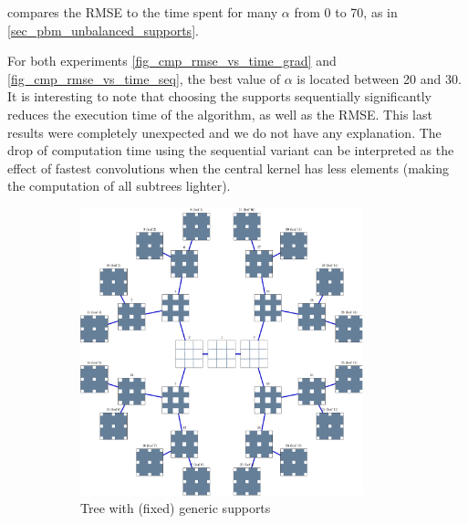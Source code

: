 \noindent
{} compares the RMSE to the time spent for many $\alpha$ from 0 to 70, as in \cref{sec_pbm_unbalanced_supports}. 

\noindent
For both experiments \cref{fig_cmp_rmse_vs_time_grad} and \cref{fig_cmp_rmse_vs_time_seq}, the best value of $\alpha$ is located between 20 and 30. It is interesting to note that choosing the supports sequentially significantly reduces the execution time of the algorithm, as well as the RMSE. This last results were completely unexpected and we do not have any explanation. The drop of computation time using the sequential variant can be interpreted as the effect of fastest convolutions when the central kernel has less elements (making the computation of all subtrees lighter).

\begin{figure}[!ht] \centering
\begin{subfigure}[b]{0.49\textwidth}\centering
\includegraphics[width=0.9\textwidth]{figures/tree-learn-setup/xp_learnsupp256_curvelet_decomp3[tree-binary_dpth4]_supp-generic3x3_[fixed-supports]_tree.pdf}
	\caption{Tree with (fixed) generic supports}
\end{subfigure}
\begin{subfigure}[b]{0.49\textwidth}\centering

\end{subfigure}
\end{figure}
